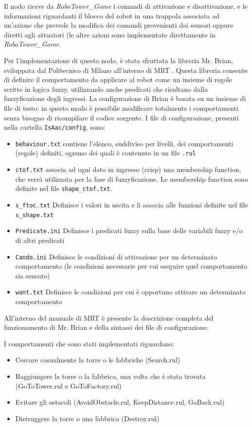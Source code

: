 Il nodo riceve da \emph{RoboTower\_Game} i comandi di attivazione e disattivazione, e le informazioni riguardanti il blocco del robot in una trappola associata ad un'azione che prevede la modifica dei comandi provenienti dai sensori oppure diretti agli attuatori (le altre azioni sono implementate direttamente in \emph{RoboTower\_Game}.

Per l'implementazione di questo nodo, è stata sfruttata la libreria Mr. Brian, sviluppata dal Politecnico di Milano all'interno di MRT \cite{mrt}. Questa libreria consente di definire il comportamento da applicare al robot come un insieme di regole scritte in logica fuzzy, utilizzando anche predicati che risultano dalla fuzzyficazione degli ingressi. La configurazione di Brian è basata su un insieme di file di testo: in questo modo è possibile modificare totalmente i comportamenti senza bisogno di ricompilare il codice sorgente. I file di configurazione, presenti nella cartella \verb|IsAac/config|, sono:
\begin{itemize}
\item \verb|behaviour.txt| contiene l'elenco, suddiviso per livelli, dei comportamenti (regole) definiti, ognuno dei quali è contenuto in un file \verb|.rul|
\item \verb|ctof.txt| associa ad ogni dato in ingresso (crisp) una membership function, che verrà utilizzata per la fase di fuzzyficazione. Le membership function sono definite nel file \verb|shape_ctof.txt|.
\item \verb|s_ftoc.txt| Definisce i valori in uscita e li associa alle funzioni definite nel file \verb|s_shape.txt|
\item \verb|Predicate.ini| Definisce i predicati fuzzy sulla base delle variabili fuzzy e/o di altri predicati
\item \verb|Cando.ini| Definisce le condizioni di attivazione per un determinato comportamento (le condizioni necessarie per cui eseguire quel comportamento sia sensato)
\item \verb|want.txt| Definisce le condizioni per cui è opportuno attivare un determinato comportamento
\end{itemize}
All'interno del manuale di MRT \cite{mrtmanual} è presente la descrizione completa del funzionamento di Mr. Brian e della sintassi dei file di configurazione.

I comportamenti che sono stati implementati riguardano:
\begin{itemize}
 \item Cercare casualmente la torre o le fabbriche (Search.rul)
 \item Raggiungere la torre o la fabbrica, una volta che è stata trovata (GoToTower.rul e GoToFactory.rul)
 \item Evitare gli ostacoli (AvoidObstacle.rul, KeepDistance.rul, GoBack.rul)
 \item Distruggere la torre o una fabbrica (Destroy.rul)
\end{itemize}


